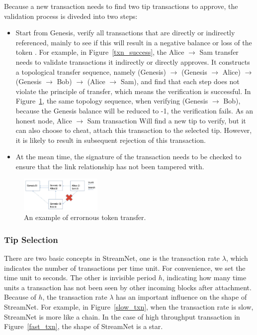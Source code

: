 Because a new transaction needs to find two tip transactions to approve, the validation process is diveded into two steps:

\begin{itemize}
\item Start from Genesis, verify all transactions that are directly or indirectly referenced, 
mainly to see if this will result in a negative balance or loss of the token \cite{gal_2018}.
For example, in Figure~\ref{txn_success}, the Alice $\rightarrow$ Sam transfer needs to validate transactions it indirectly or directly approves.
It constructs a topological transfer sequence, 
namely (Genesis) $\rightarrow$ (Genesis $\rightarrow$ Alice) $\rightarrow$ (Genesis $\rightarrow$ Bob) $\rightarrow$ (Alice $\rightarrow$ Sam),
and find that each step does not violate the principle of transfer, which means the verification is successful.
In Figure~\ref{txn_fail}, the same topology sequence, when verifying (Genesis $\rightarrow$ Bob), 
because the Genesis balance will be reduced to -1, the verification fails.
As an honest node, Alice $\rightarrow$ Sam transaction Will find a new tip to verify,
but it can also choose to cheat, attach this transaction to the selected tip.
However, it is likely to result in subsequent rejection of this transaction.
\item At the mean time, the signature of the transaction needs to be checked to ensure that the link relationship has not been tampered with.
\end{itemize}

\begin{figure}[!ht]
\begin{center}
\includegraphics[width=0.35\textwidth]{figures/txn_fail.png}
    \caption{
        An example of errornous token transfer.
     }
\label{txn_fail}
\end{center}
\end{figure}

\subsubsection{Tip Selection}
There are two basic concepts in StreamNet, one is the transaction rate $\lambda$, which indicates the number of transactions per time unit.
For convenience, we set the time unit to seconds.
The other is invisible period $h$, indicating how many time units a transaction has not been seen by other incoming blocks after attachment.
Because of $h$, the transaction rate $\lambda$ has an important influence on the shape of StreamNet.
For example, in Figure~\ref{slow_txn}, when the transaction rate is slow, StreamNet is more like a chain.
In the case of high throughput transaction in Figure~\ref{fast_txn}, the shape of StreamNet is a star.


